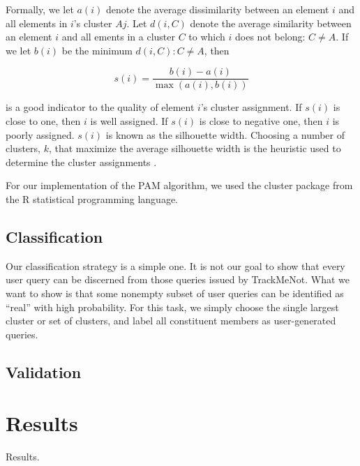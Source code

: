 \documentclass[11pt]{article}
\begin{document}
\begin{multicols}{2}
Formally, we let $a(i)$ denote the average dissimilarity between an element $i$ and all elements in $i$'s cluster $Aj$. Let $d(i,C)$ denote the average similarity between an element $i$ and all ements in a cluster $C$ to which $i$ does not belong: $C \neq A$. If we let $b(i)$ be the minimum $d(i,C) : C \neq A$, then

\[ s(i) = \frac{b(i)-a(i)}{\max{(a(i),b(i))}} \]

is a good indicator to the quality of element $i$'s cluster assignment. If $s(i)$ is close to one, then $i$ is well assigned. If $s(i)$ is close to negative one, then $i$ is poorly assigned. $s(i)$ is known as the silhouette width. Choosing a number of clusters, $k$, that maximize the average silhouette width is the heuristic used to determine the cluster assignments \cite{Kaufmann1990}.

For our implementation of the PAM algorithm, we used the cluster
package from the R statistical programming language\cite{Rcluster}.

\subsection{Classification}
\label{sec:classification}
Our classification strategy is a simple one. It is not our goal to show that every user query can be discerned from those queries issued by TrackMeNot. What we want to show is that some nonempty subset of user queries can be identified as ``real'' with high probability. For this task, we simply choose the single largest cluster or set of clusters, and label all constituent members as user-generated queries.

\subsection{Validation}


\section{Results}
\label{sec:results}

Results. \cite{tmn}


\end{multicols}
\end{document}
